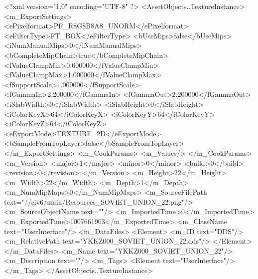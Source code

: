 <?xml version="1.0" encoding="UTF-8" ?>
<AssetObjects..TextureInstance>
	<m_ExportSettings>
		<ePixelformat>PF_R8G8B8A8_UNORM</ePixelformat>
		<eFilterType>FT_BOX</eFilterType>
		<bUseMips>false</bUseMips>
		<iNumManualMips>0</iNumManualMips>
		<bCompleteMipChain>true</bCompleteMipChain>
		<fValueClampMin>0.000000</fValueClampMin>
		<fValueClampMax>1.000000</fValueClampMax>
		<fSupportScale>1.000000</fSupportScale>
		<fGammaIn>2.200000</fGammaIn>
		<fGammaOut>2.200000</fGammaOut>
		<iSlabWidth>0</iSlabWidth>
		<iSlabHeight>0</iSlabHeight>
		<iColorKeyX>64</iColorKeyX>
		<iColorKeyY>64</iColorKeyY>
		<iColorKeyZ>64</iColorKeyZ>
		<eExportMode>TEXTURE_2D</eExportMode>
		<bSampleFromTopLayer>false</bSampleFromTopLayer>
	</m_ExportSettings>
	<m_CookParams>
		<m_Values/>
	</m_CookParams>
	<m_Version>
		<major>1</major>
		<minor>0</minor>
		<build>0</build>
		<revision>0</revision>
	</m_Version>
	<m_Height>22</m_Height>
	<m_Width>22</m_Width>
	<m_Depth>1</m_Depth>
	<m_NumMipMaps>0</m_NumMipMaps>
	<m_SourceFilePath text="//civ6/main/Resources_SOVIET_UNION_22.png"/>
	<m_SourceObjectName text=""/>
	<m_ImportedTime>0</m_ImportedTime>
	<m_ExportedTime>1007661903</m_ExportedTime>
	<m_ClassName text="UserInterface"/>
	<m_DataFiles>
		<Element>
			<m_ID text="DDS"/>
			<m_RelativePath text="YKKZ000_SOVIET_UNION_22.dds"/>
		</Element>
	</m_DataFiles>
	<m_Name text="YKKZ000_SOVIET_UNION_22"/>
	<m_Description text=""/>
	<m_Tags>
		<Element text="UserInterface"/>
	</m_Tags>
</AssetObjects..TextureInstance>

